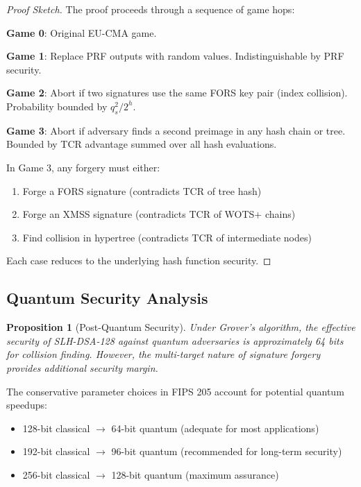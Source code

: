 \documentclass[11pt,a4paper]{article}
\newtheorem{proposition}{Proposition}
\begin{document}
\begin{proof}[Proof Sketch]
The proof proceeds through a sequence of game hops:

\textbf{Game 0}: Original EU-CMA game.

\textbf{Game 1}: Replace PRF outputs with random values. Indistinguishable by PRF security.

\textbf{Game 2}: Abort if two signatures use the same FORS key pair (index collision). Probability bounded by $q_s^2/2^h$.

\textbf{Game 3}: Abort if adversary finds a second preimage in any hash chain or tree. Bounded by TCR advantage summed over all hash evaluations.

In Game 3, any forgery must either:
\begin{enumerate}
    \item Forge a FORS signature (contradicts TCR of tree hash)
    \item Forge an XMSS signature (contradicts TCR of WOTS+ chains)
    \item Find collision in hypertree (contradicts TCR of intermediate nodes)
\end{enumerate}

Each case reduces to the underlying hash function security.
\end{proof}

\subsection{Quantum Security Analysis}

\begin{proposition}[Post-Quantum Security]
Under Grover's algorithm, the effective security of SLH-DSA-128 against quantum adversaries is approximately 64 bits for collision finding. However, the multi-target nature of signature forgery provides additional security margin.
\end{proposition}

The conservative parameter choices in FIPS 205 account for potential quantum speedups:
\begin{itemize}
    \item 128-bit classical $\to$ 64-bit quantum (adequate for most applications)
    \item 192-bit classical $\to$ 96-bit quantum (recommended for long-term security)
    \item 256-bit classical $\to$ 128-bit quantum (maximum assurance)
\end{itemize}
\end{document}
